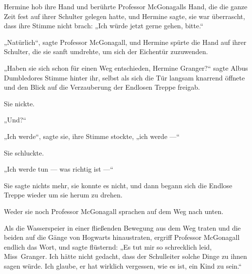 Hermine hob ihre Hand und berührte Professor McGonagalls Hand, die die ganze Zeit fest auf ihrer Schulter gelegen hatte, und Hermine sagte, sie war überrascht, dass ihre Stimme nicht brach:
„Ich würde jetzt gerne gehen, bitte.“

„Natürlich“, sagte Professor McGonagall, und Hermine spürte die Hand auf ihrer Schulter, die sie sanft umdrehte, um sich der Eichentür zuzuwenden.

„Haben sie sich schon für einen Weg entschieden, Hermine Granger?“ sagte Albus Dumbledores Stimme hinter ihr, selbst als sich die Tür langsam knarrend öffnete und den Blick auf die Verzauberung der Endlosen Treppe freigab.

Sie nickte.

„Und?“

„Ich werde“, sagte sie, ihre Stimme stockte, „ich werde —“

Sie schluckte.

„Ich werde tun — was richtig ist —“

Sie sagte nichts mehr, sie konnte es nicht, und dann begann sich die Endlose Treppe wieder um sie herum zu drehen.

Weder sie noch Professor McGonagall sprachen auf dem Weg nach unten.

Als die Wasserspeier in einer fließenden Bewegung aus dem Weg traten und die beiden auf die Gänge von Hogwarts hinaustraten, ergriff Professor McGonagall endlich das Wort, und sagte flüsternd:
„Es tut mir so schrecklich leid, Miss~Granger. Ich hätte nicht gedacht, dass der Schulleiter solche Dinge zu ihnen sagen würde. Ich glaube, er hat wirklich vergessen, wie es ist, ein Kind zu sein.“

